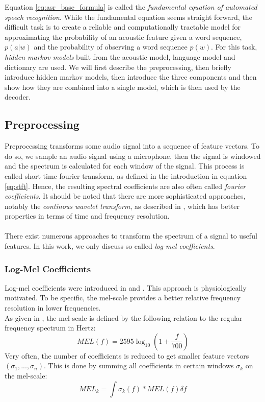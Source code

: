 Equation \ref{eq:asr_base_formula} is called the \textit{fundamental equation of automated speech recognition}. While the fundamental equation seems straight forward, the difficult task is to create a reliable and computationally tractable model for approximating the probability of an acoustic feature given a word sequence, $p(a|w)$ and the probability of observing a word sequence $p(w)$. For this task, \textit{hidden markov models} built from the acoustic model, language model and dictionary are used. We will first describe the preprocessing, then briefly introduce hidden markov models, then introduce the three components and then show how they are combined into a single model, which is then used by the decoder. 

\subsection{Preprocessing}
Preprocessing transforms some audio signal into a sequence of feature vectors. To do so, we sample an audio signal using a microphone, then the signal is windowed and the spectrum is calculated for each window of the signal. This process is called short time fourier transform, as defined in the introduction in equation \ref{eq:stft}. Hence, the resulting spectral coefficients are also often called \textit{fourier coefficients}. It should be noted that there are more sophisticated approaches, notably the \textit{continous wavelet transform}, as described in \cite{mallat1999wavelet}, which has better properties in terms of time and frequency resolution. \\ \\
There exist numerous approaches to transform the spectrum of a signal to useful features. In this work, we only discuss so called \textit{log-mel coefficients}. 
\subsubsection{Log-Mel Coefficients}
\label{sec:lmel}
Log-mel coefficients were introduced in \cite{waibel1990phoneme} and \cite{waibel1983comparative}. This approach is physiologically motivated. To be specific, the mel-scale provides a better relative frequency resolution in lower frequencies. \\
As given in \cite{poser1990speech}, the mel-scale is defined by the following relation to the regular frequency spectrum in Hertz: 
\[
MEL(f)=2595\log _{10}\left(1+{\frac {f}{700}}\right)
\]
Very often, the number of coefficients is reduced to get smaller feature vectors $(\sigma_1, ..., \sigma_n)$. This is done by summing all coefficients in certain windows $\sigma_k$ on the mel-scale: 
\[
MEL_k = \int \sigma_k(f) * MEL(f) \delta f 
\]


